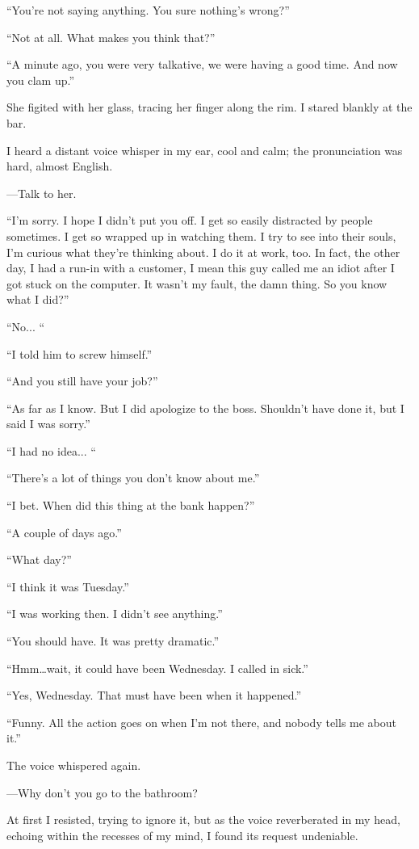 ``You're not saying anything. You sure nothing's wrong?''

``Not at all. What makes you think that?''

``A minute ago, you were very talkative, we were having a good time. And
now you clam up.''

She figited with her glass, tracing her finger along the rim. I stared
blankly at the bar.

I heard a distant voice whisper in my ear, cool and calm; the
pronunciation was hard, almost English.

---Talk to her.

``I'm sorry. I hope I didn't put you off. I get so easily distracted by
people sometimes. I get so wrapped up in watching them. I try to see
into their souls, I'm curious what they're thinking about. I do it at
work, too. In fact, the other day, I had a run-in with a customer, I
mean this guy called me an idiot after I got stuck on the computer. It
wasn't my fault, the damn thing. So you know what I did?''

``No... ``

``I told him to screw himself.''

``And you still have your job?''

``As far as I know. But I did apologize to the boss. Shouldn't have done
it, but I said I was sorry.''

``I had no idea... ``

``There's a lot of things you don't know about me.''

``I bet. When did this thing at the bank happen?''

``A couple of days ago.''

``What day?''

``I think it was Tuesday.''

``I was working then. I didn't see anything.''

``You should have. It was pretty dramatic.''

``Hmm\ldots wait, it could have been Wednesday. I called in sick.''

``Yes, Wednesday. That must have been when it happened.''

``Funny. All the action goes on when I'm not there, and nobody tells me
about it.''

The voice whispered again.

---Why don't you go to the bathroom?

At first I resisted, trying to ignore it, but as the voice reverberated
in my head, echoing within the recesses of my mind, I found its request
undeniable.

